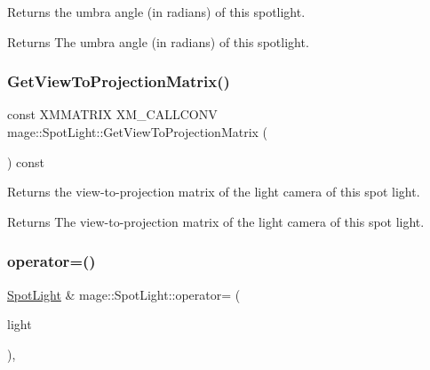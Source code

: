 Returns the umbra angle (in radians) of this spotlight.

\begin{DoxyReturn}{Returns}
The umbra angle (in radians) of this spotlight. 
\end{DoxyReturn}
\hypertarget{classmage_1_1_spot_light_ae436e8fee37639e9218cc7f3822cebbd}{}\label{classmage_1_1_spot_light_ae436e8fee37639e9218cc7f3822cebbd} 
\subsubsection{\texorpdfstring{Get\+View\+To\+Projection\+Matrix()}{GetViewToProjectionMatrix()}}
{\footnotesize\ttfamily const X\+M\+M\+A\+T\+R\+IX X\+M\+\_\+\+C\+A\+L\+L\+C\+O\+NV mage\+::\+Spot\+Light\+::\+Get\+View\+To\+Projection\+Matrix (\begin{DoxyParamCaption}{ }\end{DoxyParamCaption}) const\hspace{0.3cm}{\ttfamily [noexcept]}}

Returns the view-\/to-\/projection matrix of the light camera of this spot light.

\begin{DoxyReturn}{Returns}
The view-\/to-\/projection matrix of the light camera of this spot light. 
\end{DoxyReturn}
\hypertarget{classmage_1_1_spot_light_a5923f3d1ec5061965af8094e1e1d3855}{}\label{classmage_1_1_spot_light_a5923f3d1ec5061965af8094e1e1d3855} 
\subsubsection{\texorpdfstring{operator=()}{operator=()}\hspace{0.1cm}{\footnotesize\ttfamily [1/2]}}
{\footnotesize\ttfamily \hyperlink{classmage_1_1_spot_light}{Spot\+Light} \& mage\+::\+Spot\+Light\+::operator= (\begin{DoxyParamCaption}\item[{const \hyperlink{classmage_1_1_spot_light}{Spot\+Light} \&}]{light }\end{DoxyParamCaption})\hspace{0.3cm}{\ttfamily [default]}, {\ttfamily [noexcept]}}

